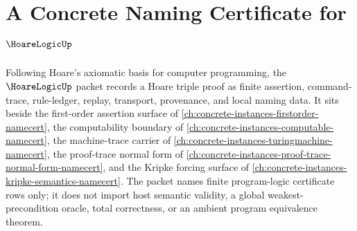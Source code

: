 \chapter{A Concrete Naming Certificate for $\HoareLogicUp$}
\label{ch:concrete-instances-hoare-logic-namecert}

Following Hoare's axiomatic basis for computer programming, the $\HoareLogicUp$ packet records a Hoare triple proof as finite assertion, command-trace, rule-ledger, replay, transport, provenance, and local naming data. It sits beside the first-order assertion surface of \autoref{ch:concrete-instances-firstorder-namecert}, the computability boundary of \autoref{ch:concrete-instances-computable-namecert}, the machine-trace carrier of \autoref{ch:concrete-instances-turingmachine-namecert}, the proof-trace normal form of \autoref{ch:concrete-instances-proof-trace-normal-form-namecert}, and the Kripke forcing surface of \autoref{ch:concrete-instances-kripke-semantics-namecert}. The packet names finite program-logic certificate rows only; it does not import host semantic validity, a global weakest-precondition oracle, total correctness, or an ambient program equivalence theorem.

